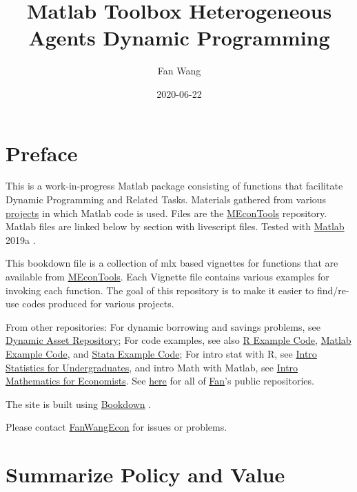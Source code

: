 \documentclass[
]{book}
\title{Matlab Toolbox Heterogeneous Agents Dynamic Programming}
\author{Fan Wang}
\date{2020-06-22}
\begin{document}
\maketitle

{
\hypersetup{linkcolor=}
\setcounter{tocdepth}{1}
\tableofcontents
}
\hypertarget{preface}{%
\chapter*{Preface}\label{preface}}

This is a work-in-progress Matlab package consisting of functions that facilitate Dynamic Programming and Related Tasks. Materials gathered from various \href{https://fanwangecon.github.io/research}{projects} in which Matlab code is used. Files are the \href{https://github.com/FanWangEcon/MEconTools}{MEconTools} repository. Matlab files are linked below by section with livescript files. Tested with \href{https://www.mathworks.com/products/matlab.html}{Matlab} 2019a \citep{matlab}.

This bookdown file is a collection of mlx based vignettes for functions that are available from \href{https://github.com/FanWangEcon/MEconTools}{MEconTools}. Each Vignette file contains various examples for invoking each function. The goal of this repository is to make it easier to find/re-use codes produced for various projects.

From other repositories: For dynamic borrowing and savings problems, see \href{https://fanwangecon.github.io/CodeDynaAsset/}{Dynamic Asset Repository}; For code examples, see also \href{https://fanwangecon.github.io/R4Econ/}{R Example Code}, \href{https://fanwangecon.github.io/M4Econ/}{Matlab Example Code}, and \href{https://fanwangecon.github.io/Stata4Econ/}{Stata Example Code}; For intro stat with R, see \href{https://fanwangecon.github.io/Stat4Econ/}{Intro Statistics for Undergraduates}, and intro Math with Matlab, see \href{https://fanwangecon.github.io/Math4Econ/}{Intro Mathematics for Economists}. See \href{https://github.com/FanWangEcon}{here} for all of \href{https://fanwangecon.github.io/}{Fan}'s public repositories.

The site is built using \href{https://bookdown.org/}{Bookdown} \citep{R-bookdown}.

Please contact \href{https://fanwangecon.github.io/}{FanWangEcon} for issues or problems.

\hypertarget{summarize-policy-and-value}{%
\chapter{Summarize Policy and Value}\label{summarize-policy-and-value}}
\end{document}
